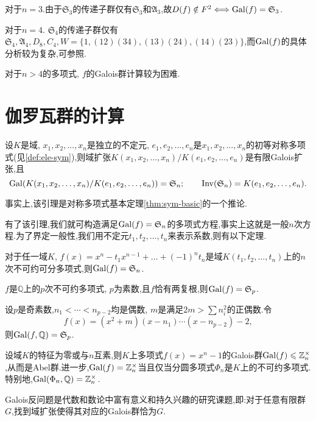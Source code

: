 对于$n=3$.由于$\mathfrak{S}_3$的传递子群仅有$\mathfrak{S}_3$和$\mathfrak{A}_3$,故$D(f)\notin F^2\Longleftrightarrow \operatorname{\mathrm{Gal}}(f)=\mathfrak{S}_3$.

对于$n=4$. $\mathfrak{S}_4$的传递子群仅有$\mathfrak{S}_4,\mathfrak{A}_4,D_8,C_4,W=\{1,(12)(34),(13)(24),(14)(23)\}$,而$\operatorname{\mathrm{Gal}}(f)$的具体分析较为复杂,可参照\cite[p.160]{FK}.

对于$n>4$的多项式, $f$的Galois群计算较为困难.
\section{伽罗瓦群的计算}
\begin{lemma}\label{lem:sym-gal}
	设$K$是域, $x_1,x_2,\dots,x_n$是独立的不定元, $e_1,e_2,\dots,e_n$是$x_1,x_2,\dots,x_n$的初等对称多项式(见\ref{def:ele-sym}),则域扩张$K(x_1,x_2,\dots,x_n)/K(e_1,e_2,\dots,e_n)$是有限Galois扩张,且
	\[
	\operatorname{\mathrm{Gal}}(K(x_1,x_2,\dots,x_n)/K(e_1,e_2,\dots,e_n))=\mathfrak{S}_n;\qquad\operatorname{\mathrm{Inv}}(\mathfrak{S}_n)=K(e_1,e_2,\dots,e_n).
	\]
	
	事实上,该引理是对称多项式基本定理\ref{thm:sym-basic}的一个推论.
\end{lemma}

有了该引理,我们就可构造满足$\operatorname{\mathrm{Gal}}(f)=\mathfrak{S}_n$的多项式方程,事实上这就是一般$n$次方程.为了界定一般性,我们用不定元$t_1,t_2,\dots,t_n$来表示系数,则有以下定理.
\begin{lemma}\label{lem:trivial-equation}
	对于任一域$K$, $f(x)=x^n-t_1x^{n-1}+\dots+\left(-1\right)^nt_n$是域$K(t_1,t_2,\dots,t_n)$上的$n$次不可约可分多项式,则$\operatorname{\mathrm{Gal}}(f)=\mathfrak{S}_n$.
\end{lemma}
\begin{proposition}
	$f$是$\mathbb{Q}$上的$p$次不可约多项式, $p$为素数,且$f$恰有两复根,则$\operatorname{\mathrm{Gal}}(f)=\mathfrak{S}_p$.
\end{proposition}
\begin{example}[Brauer]
	设$p$是奇素数,$n_1<\cdots<n_{p-2}$均是偶数, $m$是满足$2m>\sum n_{i}^2$的正偶数.令
	\[
	f(x)=(x^2+m)(x-n_1)\cdots(x-n_{p-2})-2,
	\]
	则$\operatorname{\mathrm{Gal}}(f,\mathbb{Q})=\mathfrak{S}_p$.
\end{example}
\begin{proposition}
	设域$K$的特征为零或与$n$互素,则$K$上多项式$f(x)=x^n-1$的Galois群$\operatorname{\mathrm{Gal}}(f)\leqslant\mathbb{Z}_n^\times$,从而是Abel群.进一步,$\operatorname{\mathrm{Gal}}(f)=\mathbb{Z}_n^\times$当且仅当分圆多项式$\Phi_n$是$K$上的不可约多项式.特别地,$\operatorname{\mathrm{Gal}}(\Phi_n,\mathbb{Q})=\mathbb{Z}_n^\times$.
\end{proposition}

Galois反问题是代数和数论中富有意义和持久兴趣的研究课题,即:对于任意有限群$G$,找到域扩张使得其对应的Galois群恰为$G$.

